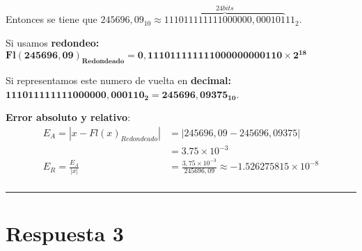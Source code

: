 \documentclass{article}
\begin{document}
{\noindent
	Entonces se tiene que $245696,09_{10} \approx \overbrace{111011111111000000,000101}^{24 bits}11_{2}$. \newline

\noindent	
	Si usamos \textbf{redondeo:} \newline
	$\boldsymbol{Fl(245696,09)_{Redondeado} = 0,111011111111000000000110 \times 2^{18}}$
	\newline

\noindent	
	Si representamos este numero de vuelta en \textbf{decimal:} \newline
	$\boldsymbol{111011111111000000,000110_{2} = 245696,09375_{10}}$. \newline
	

\noindent	
	\textbf{Error absoluto y relativo}:
	\begin{align*}
	E_{A} = |x - Fl(x)_{Redondeado}| & = |245696,09 - 245696,09375| \\
	& = 3.75 \times 10^{-3} \\
	E_{R} = \frac{E_{A}}{|x|} & = \frac{3,75 \times 10^{-3}}{245696,09} \approx -1.526275815 \times 10^{-8} \\
	\end{align*}
}	


\hrule
\section*{Respuesta 3}
\end{document}
